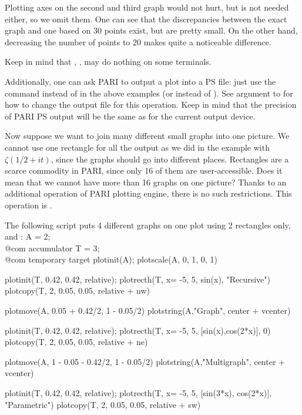\noindent Plotting axes on the second and third graph would not hurt, but
is not needed either, so we omit them.  One can see that the discrepancies
between the exact graph and one based on 30 points exist, but are pretty
small.  On the other hand, decreasing the number of points to 20 makes
quite a noticeable difference.

Keep in mind that , ,
 may do nothing on some terminals.

Additionally, one can ask PARI to output a plot into a PS file: just
use the command  instead of  in the above examples
(or  instead of ).  See  argument
to  for how to change the output file for this operation.  Keep
in mind that the precision of PARI PS output will be the same as for the
current output device.

Now suppose we want to join many different small graphs into one picture.
We cannot use one rectangle for all the output as we did in the example
with $\zeta({1/2}+it)$, since the graphs should go into different places.
Rectangles are a scarce commodity in PARI, since only 16 of them are
user-accessible.  Does it mean that we cannot have more than 16 graphs on
one picture?  Thanks to an additional operation of PARI plotting engine,
there is no such restrictions.  This operation is .

The following script puts 4 different graphs on one plot using 2 rectangles
only,  and :
\bprog
  A = 2;   \\@com accumulator
  T = 3;   \\@com temporary target
  plotinit(A);         plotscale(A, 0, 1, 0, 1)

  plotinit(T, 0.42, 0.42, relative);
  plotrecth(T, x= -5, 5, sin(x), "Recursive")
  plotcopy(T, 2, 0.05, 0.05, relative + nw)

  plotmove(A, 0.05 + 0.42/2, 1 - 0.05/2)
  plotstring(A,"Graph", center + vcenter)

  plotinit(T, 0.42, 0.42, relative);
  plotrecth(T, x= -5, 5, [sin(x),cos(2*x)], 0)
  plotcopy(T, 2, 0.05, 0.05, relative + ne)

  plotmove(A, 1 - 0.05 - 0.42/2, 1 - 0.05/2)
  plotstring(A,"Multigraph", center + vcenter)

  plotinit(T, 0.42, 0.42, relative);
  plotrecth(T, x= -5, 5, [sin(3*x), cos(2*x)], "Parametric")
  plotcopy(T, 2, 0.05, 0.05, relative + sw)


